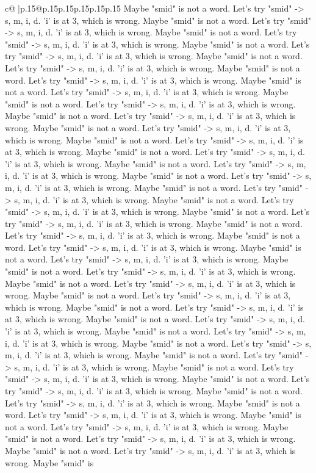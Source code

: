 \documentclass{article}
\begin{document}
{\begin{supertabular}{c@{$\;$}|p{.15\linewidth}@{}p{.15\linewidth}p{.15\linewidth}p{.15\linewidth}p{.15\linewidth}p{.15\linewidth}}
{{{Maybe "smid" is not a word. Let's try "smid" {-}> s, m, i, d. 'i' is at 3, which is wrong. Maybe "smid" is not a word. Let's try "smid" {-}> s, m, i, d. 'i' is at 3, which is wrong. Maybe "smid" is not a word. Let's try "smid" {-}> s, m, i, d. 'i' is at 3, which is wrong. Maybe "smid" is not a word. Let's try "smid" {-}> s, m, i, d. 'i' is at 3, which is wrong. Maybe "smid" is not a word. Let's try "smid" {-}> s, m, i, d. 'i' is at 3, which is wrong. Maybe "smid" is not a word. Let's try "smid" {-}> s, m, i, d. 'i' is at 3, which is wrong. Maybe "smid" is not a word. Let's try "smid" {-}> s, m, i, d. 'i' is at 3, which is wrong. Maybe "smid" is not a word. Let's try "smid" {-}> s, m, i, d. 'i' is at 3, which is wrong. Maybe "smid" is not a word. Let's try "smid" {-}> s, m, i, d. 'i' is at 3, which is wrong. Maybe "smid" is not a word. Let's try "smid" {-}> s, m, i, d. 'i' is at 3, which is wrong. Maybe "smid" is not a word. Let's try "smid" {-}> s, m, i, d. 'i' is at 3, which is wrong. Maybe "smid" is not a word. Let's try "smid" {-}> s, m, i, d. 'i' is at 3, which is wrong. Maybe "smid" is not a word. Let's try "smid" {-}> s, m, i, d. 'i' is at 3, which is wrong. Maybe "smid" is not a word. Let's try "smid" {-}> s, m, i, d. 'i' is at 3, which is wrong. Maybe "smid" is not a word. Let's try "smid" {-}> s, m, i, d. 'i' is at 3, which is wrong. Maybe "smid" is not a word. Let's try "smid" {-}> s, m, i, d. 'i' is at 3, which is wrong. Maybe "smid" is not a word. Let's try "smid" {-}> s, m, i, d. 'i' is at 3, which is wrong. Maybe "smid" is not a word. Let's try "smid" {-}> s, m, i, d. 'i' is at 3, which is wrong. Maybe "smid" is not a word. Let's try "smid" {-}> s, m, i, d. 'i' is at 3, which is wrong. Maybe "smid" is not a word. Let's try "smid" {-}> s, m, i, d. 'i' is at 3, which is wrong. Maybe "smid" is not a word. Let's try "smid" {-}> s, m, i, d. 'i' is at 3, which is wrong. Maybe "smid" is not a word. Let's try "smid" {-}> s, m, i, d. 'i' is at 3, which is wrong. Maybe "smid" is not a word. Let's try "smid" {-}> s, m, i, d. 'i' is at 3, which is wrong. Maybe "smid" is not a word. Let's try "smid" {-}> s, m, i, d. 'i' is at 3, which is wrong. Maybe "smid" is not a word. Let's try "smid" {-}> s, m, i, d. 'i' is at 3, which is wrong. Maybe "smid" is not a word. Let's try "smid" {-}> s, m, i, d. 'i' is at 3, which is wrong. Maybe "smid" is not a word. Let's try "smid" {-}> s, m, i, d. 'i' is at 3, which is wrong. Maybe "smid" is not a word. Let's try "smid" {-}> s, m, i, d. 'i' is at 3, which is wrong. Maybe "smid" is not a word. Let's try "smid" {-}> s, m, i, d. 'i' is at 3, which is wrong. Maybe "smid" is not a word. Let's try "smid" {-}> s, m, i, d. 'i' is at 3, which is wrong. Maybe "smid" is not a word. Let's try "smid" {-}> s, m, i, d. 'i' is at 3, which is wrong. Maybe "smid" is not a word. Let's try "smid" {-}> s, m, i, d. 'i' is at 3, which is wrong. Maybe "smid" is not a word. Let's try "smid" {-}> s, m, i, d. 'i' is at 3, which is wrong. Maybe "smid" is not a word. Let's try "smid" {-}> s, m, i, d. 'i' is at 3, which is wrong. Maybe "smid" is not a word. Let's try "smid" {-}> s, m, i, d. 'i' is at 3, which is wrong. Maybe "smid" is }}}
\end{supertabular}}
\end{document}
